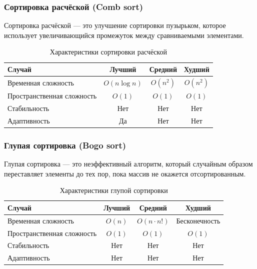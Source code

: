 \documentclass[a4paper,12pt]{article}
\begin{document}
\subsubsection{Сортировка расчёской (Comb sort)}
\label{subsubsec:сортировка-расчёской-comb-sort}

Сортировка расчёской --- это улучшение сортировки пузырьком, которое использует увеличивающийся промежуток между сравниваемыми элементами.

\begin{table}[H]
    \centering
    \begin{tabular}{|l|c|c|c|}
        \hline
        Случай & Лучший & Средний & Худший \\
        \hline
        Временная сложность & $O(n \log n)$ & $O(n^2)$ & $O(n^2)$ \\
        \hline
        Пространственная сложность & $O(1)$ & $O(1)$ & $O(1)$ \\
        \hline
        Стабильность & Нет & Нет & Нет \\
        \hline
        Адаптивность & Да & Нет & Нет \\
        \hline
    \end{tabular}
    \caption{Характеристики сортировки расчёской}
\end{table}

\subsubsection{Глупая сортировка (Bogo sort)}
\label{subsubsec:глупая-сортировка-bogo-sort}

Глупая сортировка --- это неэффективный алгоритм, который случайным образом переставляет элементы до тех пор, пока массив не окажется отсортированным.

\begin{table}[H]
    \centering
    \begin{tabular}{|l|c|c|c|}
        \hline
        Случай & Лучший & Средний & Худший \\
        \hline
        Временная сложность & $O(n)$ & $O(n \cdot n!)$ & Бесконечность \\
        \hline
        Пространственная сложность & $O(1)$ & $O(1)$ & $O(1)$ \\
        \hline
        Стабильность & Нет & Нет & Нет \\
        \hline
        Адаптивность & Нет & Нет & Нет \\
        \hline
    \end{tabular}
    \caption{Характеристики глупой сортировки}
\end{table}
\end{document}
